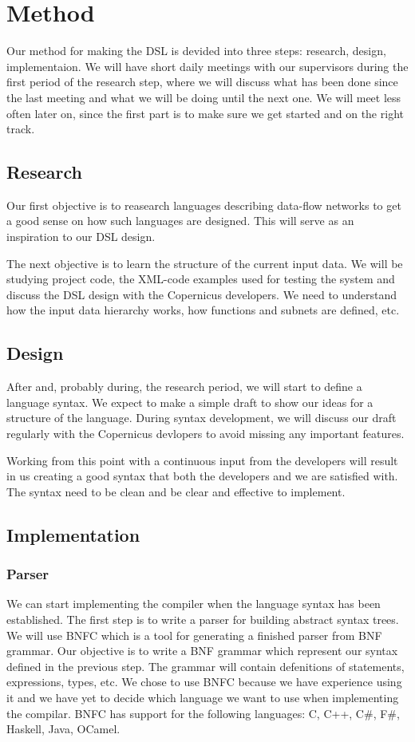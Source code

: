 \documentclass[a4paper]{article}
\begin{document}
\section{Method}
Our method for making the DSL is devided into three steps: research,
design, implementaion. We will have short daily meetings with our
supervisors during the first period of the research step, where we
will discuss what has been done since the last meeting and what we
will be doing until the next one. We will meet less often later on,
since the first part is to make sure we get started and on the right
track.

\subsection{Research}
Our first objective is to reasearch languages describing data-flow
networks to get a good sense on how such languages are designed. This
will serve as an inspiration to our DSL design.

The next objective is to learn the structure of the current input
data. We will be studying project code, the XML-code examples used for
testing the system and discuss the DSL design with the Copernicus
developers. We need to understand how the input data hierarchy works,
how functions and subnets are defined, etc.

\subsection{Design}
After and, probably during, the research period, we will start to
define a language syntax. We expect to make a simple draft to show our
ideas for a structure of the language. During syntax development, we
will discuss our draft regularly with the Copernicus devlopers to
avoid missing any important features.

Working from this point with a continuous input from the developers
will result in us creating a good syntax that both the developers and
we are satisfied with. The syntax need to be clean and be clear and
effective to implement.

\subsection{Implementation}
\subsubsection{Parser}
We can start implementing the compiler when the language syntax has
been established. The first step is to write a parser for building
abstract syntax trees. We will use BNFC which is a tool for generating
a finished parser from BNF grammar. Our objective is to write a BNF
grammar which represent our syntax defined in the previous step. The
grammar will contain defenitions of statements, expressions, types,
etc. We chose to use BNFC because we have experience using it and we
have yet to decide which language we want to use when implementing the
compilar. BNFC has support for the following languages: C, C++, C\#,
F\#, Haskell, Java, OCamel.
\end{document}
